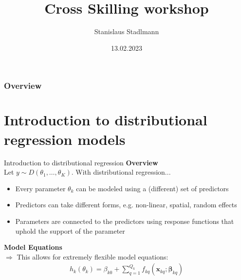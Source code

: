 \documentclass[xcolor=dvipsnames, t]{beamer}
\title[Cross Skilling workshop]{Cross Skilling workshop}
\subtitle{}
\author[Stadlmann]{Stanislaus Stadlmann} %
\institute[] {
	Sydney Informatics Hub \hfill University of Sydney\\
	\vspace{0.2cm}
\textit{stanislaus,.stadlmann@sydney.edu.au} %
}
\date{13.02.2023} %
\newcommand{\bx}{\textbf{x}}
\newcommand{\bbeta}{\boldsymbol{\beta}}
\begin{document}
\begin{frame}
\titlepage %
\end{frame}



\begin{frame}
	\frametitle{Overview} %
	\tableofcontents 
\end{frame}

\section{Introduction to distributional regression models}

\begin{frame}{Introduction to distributional regression}
	\textbf{Overview} \\
	Let $y \sim D(\theta_1, \ldots, \theta_K)$. With distributional regression...
	\begin{itemize}
		\item Every parameter $\theta_k$ can be modeled using a (different) set of predictors
		\item Predictors can take different forms, e.g. non-linear, spatial, random effects
		\item Parameters are connected to the predictors using response functions that uphold the support of the parameter
	\end{itemize}
	\textbf{Model Equations} \\
	$\Rightarrow$ This allows for extremely flexible model equations:
\begin{equation*}
	\label{eq:distregeq}
	\begin{split}
		h_k(\theta_k) = \beta_{k0} + \sum\limits^{Q_k}_{q = 1} f_{kq}(\bx_{kq}; \bbeta_{kq}) \\
	\end{split}
\end{equation*}
\end{frame}
\end{document}
